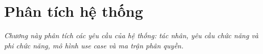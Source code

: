 \chapter{Phân tích hệ thống}
\label{chapter:phantich}

\textit{Chương này phân tích các yêu cầu của hệ thống: tác nhân, yêu cầu chức năng và phi chức năng, mô hình use case và ma trận phân quyền.}








